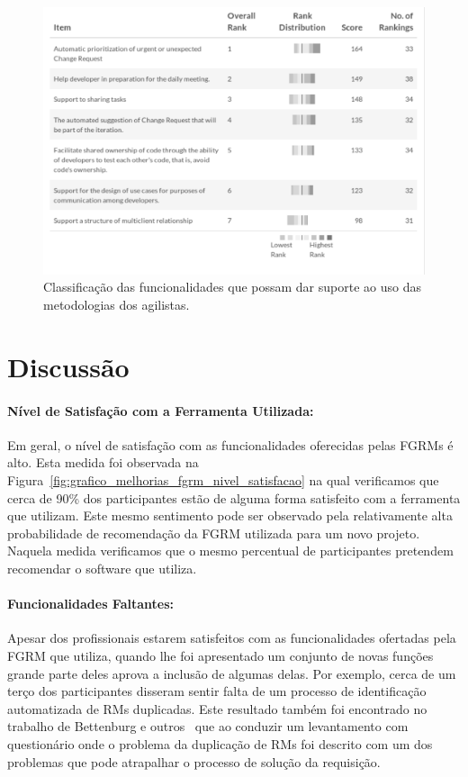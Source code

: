\begin{figure}[htpb]
	\centering
	\includegraphics[width=0.8\linewidth]{./chapter-pesquisa-com-profissionais/img/grafico_melhorias_fgrm_suporte_particas_ageis.pdf}
	\caption{Classificação das funcionalidades que possam dar suporte ao uso das
	metodologias dos agilistas.}
\label{fig:grafico_melhorias_fgrm_suporte_particas_ageis}
\end{figure}

\section{Discussão}

\paragraph{Nível de Satisfação com a Ferramenta Utilizada:}
\label{par:pesq_profissionais_nivel_de_satisfação}

Em geral, o nível de satisfação com as funcionalidades oferecidas pelas FGRMs é
alto. Esta medida foi observada na
Figura~\ref{fig:grafico_melhorias_fgrm_nivel_satisfacao} na qual verificamos que
cerca de 90\% dos participantes estão de alguma forma satisfeito com a
ferramenta que utilizam. Este mesmo sentimento pode ser observado pela
relativamente alta probabilidade de recomendação da FGRM utilizada para um novo
projeto. Naquela medida verificamos que o mesmo percentual de participantes
pretendem recomendar o software que utiliza.

\paragraph{Funcionalidades Faltantes:}
\label{par:pesq_profissionais_funcionalidades_faltantes}

Apesar dos profissionais estarem satisfeitos com as funcionalidades ofertadas
pela FGRM que utiliza, quando lhe foi apresentado um conjunto de novas funções
grande parte deles aprova a inclusão de algumas delas. Por exemplo,
cerca de um terço dos participantes disseram sentir falta de um processo de
identificação automatizada de RMs duplicadas. Este resultado também foi encontrado
no trabalho de Bettenburg e outros~\cite{bettenburg2008makes} que ao conduzir um
levantamento com questionário onde o problema da duplicação de RMs foi descrito
com um dos problemas que pode atrapalhar o processo de solução da requisição.

